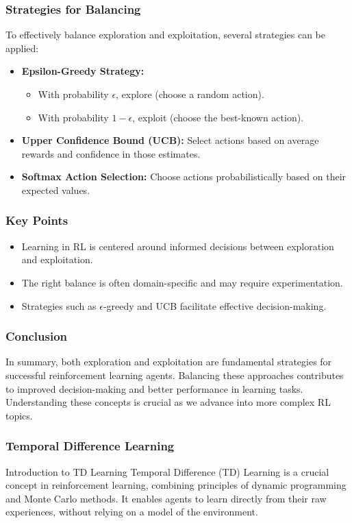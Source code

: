 \documentclass[aspectratio=169]{beamer}
\begin{document}
\begin{frame}[fragile]
    \frametitle{Strategies for Balancing}
    To effectively balance exploration and exploitation, several strategies can be applied:

    \begin{itemize}
        \item \textbf{Epsilon-Greedy Strategy:} 
            \begin{itemize}
                \item With probability $\epsilon$, explore (choose a random action).
                \item With probability $1 - \epsilon$, exploit (choose the best-known action).
            \end{itemize}
        \item \textbf{Upper Confidence Bound (UCB):} Select actions based on average rewards and confidence in those estimates.
        \item \textbf{Softmax Action Selection:} Choose actions probabilistically based on their expected values.
    \end{itemize}
\end{frame}

\begin{frame}[fragile]
    \frametitle{Key Points}
    \begin{itemize}
        \item Learning in RL is centered around informed decisions between exploration and exploitation.
        \item The right balance is often domain-specific and may require experimentation.
        \item Strategies such as $\epsilon$-greedy and UCB facilitate effective decision-making.
    \end{itemize}
\end{frame}

\begin{frame}[fragile]
    \frametitle{Conclusion}
    In summary, both exploration and exploitation are fundamental strategies for successful reinforcement learning agents. Balancing these approaches contributes to improved decision-making and better performance in learning tasks. Understanding these concepts is crucial as we advance into more complex RL topics.
\end{frame}

\begin{frame}[fragile]
    \frametitle{Temporal Difference Learning}
    \begin{block}{Introduction to TD Learning}
        Temporal Difference (TD) Learning is a crucial concept in reinforcement learning, combining principles of dynamic programming and Monte Carlo methods. It enables agents to learn directly from their raw experiences, without relying on a model of the environment.
    \end{block}
\end{frame}
\end{document}

